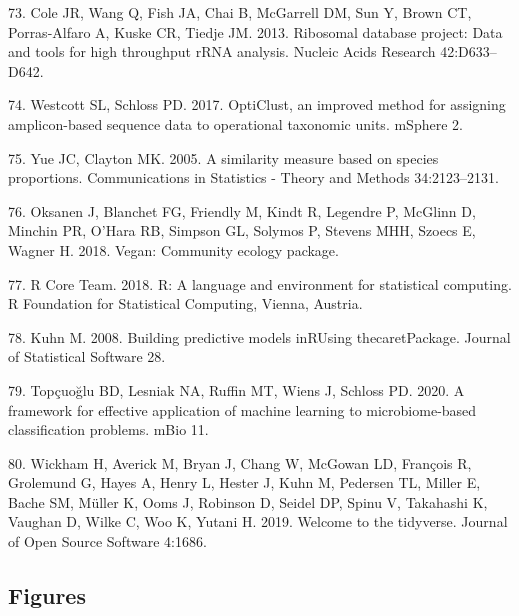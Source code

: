 \documentclass[
  11pt,
]{article}
\begin{document}
\leavevmode\hypertarget{ref-Cole2013}{}%
73. Cole JR, Wang Q, Fish JA, Chai B, McGarrell DM, Sun Y, Brown CT,
Porras-Alfaro A, Kuske CR, Tiedje JM. 2013. Ribosomal database project:
Data and tools for high throughput rRNA analysis. Nucleic Acids Research
42:D633--D642.

\leavevmode\hypertarget{ref-Westcott2017}{}%
74. Westcott SL, Schloss PD. 2017. OptiClust, an improved method for
assigning amplicon-based sequence data to operational taxonomic units.
mSphere 2.

\leavevmode\hypertarget{ref-Yue2005}{}%
75. Yue JC, Clayton MK. 2005. A similarity measure based on species
proportions. Communications in Statistics - Theory and Methods
34:2123--2131.

\leavevmode\hypertarget{ref-Vegan2018}{}%
76. Oksanen J, Blanchet FG, Friendly M, Kindt R, Legendre P, McGlinn D,
Minchin PR, O'Hara RB, Simpson GL, Solymos P, Stevens MHH, Szoecs E,
Wagner H. 2018. Vegan: Community ecology package.

\leavevmode\hypertarget{ref-r_citation_2018}{}%
77. R Core Team. 2018. R: A language and environment for statistical
computing. R Foundation for Statistical Computing, Vienna, Austria.

\leavevmode\hypertarget{ref-Kuhn2008}{}%
78. Kuhn M. 2008. Building predictive models inRUsing thecaretPackage.
Journal of Statistical Software 28.

\leavevmode\hypertarget{ref-Topcuoglu2020}{}%
79. Topçuoğlu BD, Lesniak NA, Ruffin MT, Wiens J, Schloss PD. 2020. A
framework for effective application of machine learning to
microbiome-based classification problems. mBio 11.

\leavevmode\hypertarget{ref-Tidyverse2019}{}%
80. Wickham H, Averick M, Bryan J, Chang W, McGowan LD, François R,
Grolemund G, Hayes A, Henry L, Hester J, Kuhn M, Pedersen TL, Miller E,
Bache SM, Müller K, Ooms J, Robinson D, Seidel DP, Spinu V, Takahashi K,
Vaughan D, Wilke C, Woo K, Yutani H. 2019. Welcome to the tidyverse.
Journal of Open Source Software 4:1686.

\newpage

\hypertarget{figures}{%
\subsection{Figures}\label{figures}}
\end{document}
